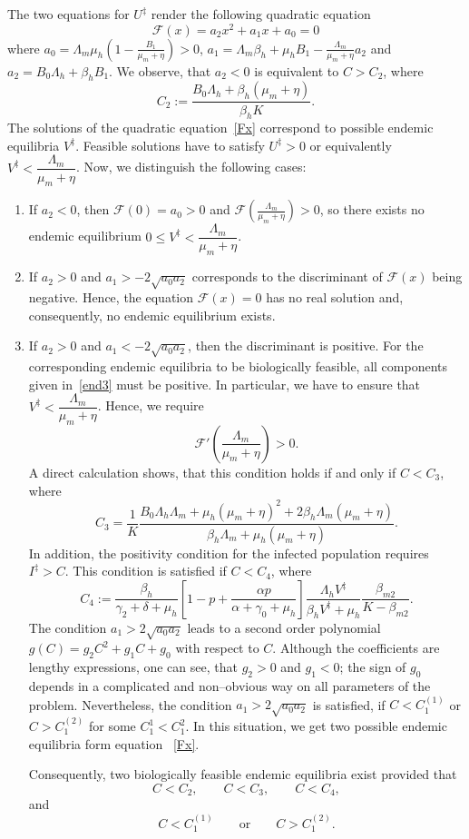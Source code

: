 \documentclass[preprint]{elsarticle}
\begin{document}
The two equations for $U^\ddagger$ render the following quadratic equation
\begin{equation}\label{Fx}
    \mathcal{F}(x) = a_2 x^2 + a_1 x + a_0 = 0
\end{equation}
where $a_0 =\Lambda_m\mu_h \left( 1- \frac{B_1}{\mu_m+\eta}\right) >0$, $a_1 = \Lambda_m\beta_h + \mu_h B_1 - \frac{\Lambda_m}{\mu_m +\eta}a_2$ and $a_2= B_0\Lambda_h + \beta_h B_1$. We observe, that $a_2<0$ is equivalent to $C>C_2$, where
\[
C_2:= \dfrac{B_0\Lambda_h+\beta_h(\mu_m+\eta)}
{\beta_h K}.
\]
The solutions of the quadratic equation~\eqref{Fx} correspond to possible endemic equilibria $V^\ddagger$. Feasible solutions have to satisfy $U^\ddagger >0$ or equivalently $V^\ddagger < \dfrac{\Lambda_m}{\mu_m+\eta}$. Now, we distinguish the following cases:
\begin{enumerate}
\item If $a_2<0$, then  $\mathcal{F}(0)=a_0>0$ and $\mathcal{F}\left(\frac{\Lambda_m}{\mu_m+\eta}\right) >0$, so there exists no endemic equilibrium $0\le V^\ddagger<\dfrac{\Lambda_m}{\mu_m+\eta}$.


\item If $a_2>0$ and $a_1>-2\sqrt{a_0a_2}$ corresponds to the discriminant of $\mathcal{F}(x)$ being negative. Hence, the equation $\mathcal{F}(x)=0$ has no real solution and, consequently, no endemic equilibrium exists.

\item If $a_2>0$ and $a_1<-2\sqrt{a_0a_2}$, then the discriminant is positive. For the corresponding endemic equilibria to be biologically feasible, all components given in~\eqref{end3} must be positive. In particular, we have to ensure that $V^\ddagger<\dfrac{\Lambda_m}{\mu_m+\eta}$. Hence, we require
\[
\mathcal{F}'\left(\dfrac{\Lambda_m}{\mu_m+\eta}\right)>0.
\]
A direct calculation shows,  that this condition holds if and only if $C<C_3$, where
\[
C_3
=
\frac{1}{K}
\frac{
B_0\Lambda_h\Lambda_m
+\mu_h(\mu_m+\eta)^2
+2\beta_h\Lambda_m(\mu_m+\eta)
}{
\beta_h\Lambda_m+\mu_h(\mu_m+\eta)
}.
\]
In addition, the positivity condition for the infected population requires $I^\ddagger>C$. This condition is satisfied if $C<C_4$, where
\[
C_4
:=
\frac{\beta_h}{\gamma_2+\delta+\mu_h}
\left[
1-p+\frac{\alpha p}{\alpha+\gamma_0+\mu_h}
\right]
\frac{\Lambda_hV^\ddagger}{\beta_hV^\ddagger+\mu_h}
\frac{\beta_{m2}}{K-\beta_{m2}}.
\]
The condition $a_1>2\sqrt{a_0 a_2}$ leads to a second order polynomial $g(C)=g_2 C^2+g_1 C+g_0$ with respect to $C$. Although the coefficients are lengthy expressions, one can see, that $g_2>0$ and $g_1<0$; the sign of $g_0$ depends in a complicated and non--obvious way on all parameters of the problem. Nevertheless, the condition $a_1>2\sqrt{a_0 a_2}$ is satisfied, if $C<C_1^{(1)}$ or $C>C_1^{(2)}$ for some $C_1^1 < C_1^2$. In this situation, we get two possible endemic equilibria form equation ~\eqref{Fx}.

Consequently, two biologically feasible endemic equilibria exist provided that
\[
C<C_2,\qquad
C<C_3,\qquad
C<C_4,
\]
and
\[
C<C_1^{(1)}
\qquad\text{or}\qquad
C>C_1^{(2)}.
\]
\end{enumerate}
\end{document}
